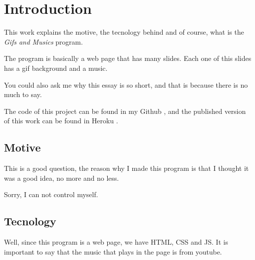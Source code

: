 
\section{Introduction} %

This work explains the motive, the tecnology behind and of course, what is the \textit{Gifs and Musics} program.

The program is basically a web page that has many slides. Each one of this slides has a gif background and a music.
 
You could also ask me why this essay is so short, and that is because there is no much to say.

The code of this project can be found in my Github \cite{craviee}, and the published version of this work can be found in Heroku \cite{heroku}.
	


\subsection{Motive} %

This is a good question, the reason why I made this program is that I thought it was a good idea, no more and no less.

Sorry, I can not control myself.


\subsection{Tecnology} %
\label{sec:tec}

Well, since this program is a web page, we have HTML, CSS and JS.
It is important to say that the music that plays in the page is from youtube.

